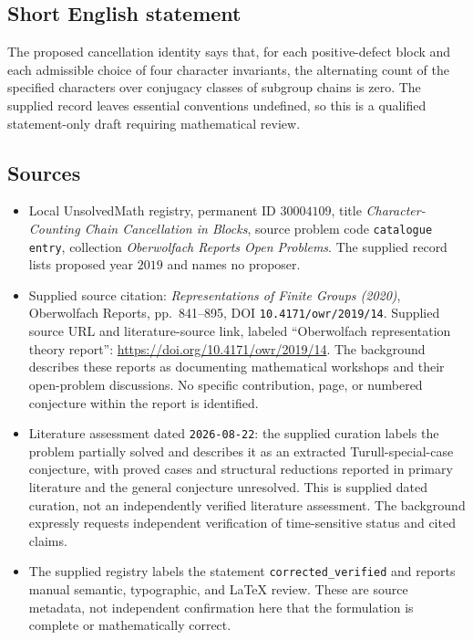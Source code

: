 \documentclass[11pt]{article}
\begin{document}
\subsection{Short English statement}
The proposed cancellation identity says that, for each positive-defect block and each admissible choice of four character invariants, the alternating count of the specified characters over conjugacy classes of subgroup chains is zero. The supplied record leaves essential conventions undefined, so this is a qualified statement-only draft requiring mathematical review.
\subsection{Sources}
\begin{itemize}
\item Local UnsolvedMath registry, permanent ID \(30004109\), title \emph{Character-Counting Chain Cancellation in Blocks}, source problem code \texttt{catalogue entry}, collection \emph{Oberwolfach Reports Open Problems}. The supplied record lists proposed year \(2019\) and names no proposer.
\item Supplied source citation: \emph{Representations of Finite Groups (2020)}, Oberwolfach Reports, pp.~841--895, DOI \texttt{10.4171/owr/2019/14}. Supplied source URL and literature-source link, labeled ``Oberwolfach representation theory report'': \url{https://doi.org/10.4171/owr/2019/14}. The background describes these reports as documenting mathematical workshops and their open-problem discussions. No specific contribution, page, or numbered conjecture within the report is identified.
\item Literature assessment dated \texttt{2026-08-22}: the supplied curation labels the problem partially solved and describes it as an extracted Turull-special-case conjecture, with proved cases and structural reductions reported in primary literature and the general conjecture unresolved. This is supplied dated curation, not an independently verified literature assessment. The background expressly requests independent verification of time-sensitive status and cited claims.
\item The supplied registry labels the statement \texttt{corrected\_verified} and reports manual semantic, typographic, and LaTeX review. These are source metadata, not independent confirmation here that the formulation is complete or mathematically correct.
\end{itemize}
\end{document}
